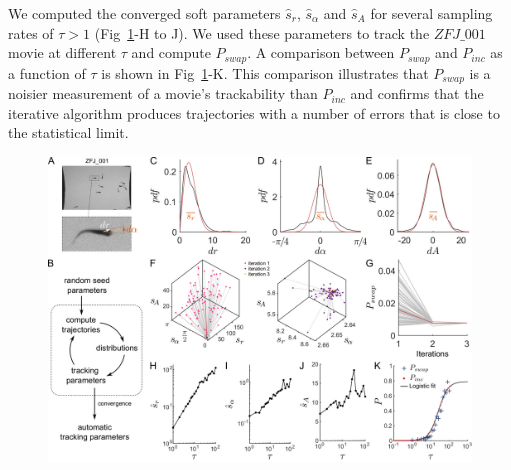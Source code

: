         We computed the converged soft parameters $\hat{s}_r$, $\hat{s}_\alpha$ and $\hat{s}_A$ for several sampling rates of $\tau>1$ (Fig~\ref{part_1:fig_5}-H to J). We used these parameters to track the $ZFJ\_001$ movie at different $\tau$ and compute $P_{swap}$. A comparison between $P_{swap}$ and $P_{inc}$ as a function of $\tau$ is shown in Fig~\ref{part_1:fig_5}-K. This comparison illustrates that $P_{swap}$ is a noisier measurement of a movie's trackability than $P_{inc}$ and confirms that the iterative algorithm produces trajectories with a number of errors that is close to the statistical limit.

        \begin{figure}[h!]
        \centering
        \includegraphics[width=1\textwidth]{part_1/assets/Figure_5.png}
        \caption{\textbf{}}
        \label{part_1:fig_5}
        \end{figure}


